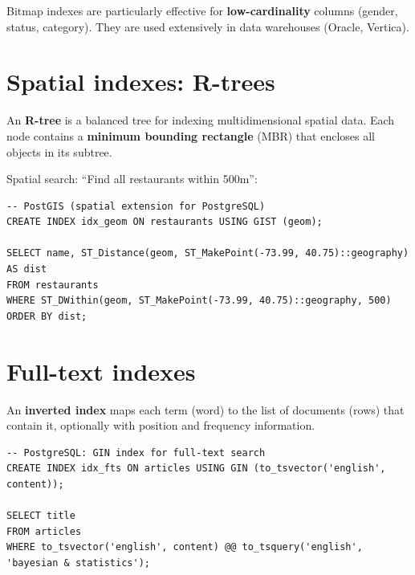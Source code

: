 \begin{remark}
Bitmap indexes are particularly effective for \textbf{low-cardinality}
columns (gender, status, category). They are used extensively in data
warehouses (Oracle, Vertica).
\end{remark}

\section{Spatial indexes: R-trees}

\begin{definition}[R-tree]
An \textbf{R-tree} is a balanced tree for indexing multidimensional spatial
data. Each node contains a \textbf{minimum bounding rectangle} (MBR) that
encloses all objects in its subtree.
\end{definition}

\begin{example}
Spatial search: ``Find all restaurants within 500m'':
\begin{verbatim}
-- PostGIS (spatial extension for PostgreSQL)
CREATE INDEX idx_geom ON restaurants USING GIST (geom);

SELECT name, ST_Distance(geom, ST_MakePoint(-73.99, 40.75)::geography) AS dist
FROM restaurants
WHERE ST_DWithin(geom, ST_MakePoint(-73.99, 40.75)::geography, 500)
ORDER BY dist;
\end{verbatim}
\end{example}

\section{Full-text indexes}

\begin{definition}
An \textbf{inverted index} maps each term (word) to the list of documents
(rows) that contain it, optionally with position and frequency information.
\end{definition}

\begin{example}
\begin{verbatim}
-- PostgreSQL: GIN index for full-text search
CREATE INDEX idx_fts ON articles USING GIN (to_tsvector('english', content));

SELECT title
FROM articles
WHERE to_tsvector('english', content) @@ to_tsquery('english', 'bayesian & statistics');
\end{verbatim}
\end{example}


